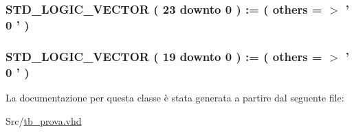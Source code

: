 \hypertarget{classtb__prova_1_1_behavioral_a64a5b798ab546bcb78f8795386e26dfa}{
\subsubsection[{x}]{ {\bfseries \textcolor{vhdlchar}{S\+T\+D\+\_\+\+L\+O\+G\+I\+C\+\_\+\+V\+E\+C\+T\+O\+R}\textcolor{vhdlchar}{ }\textcolor{vhdlchar}{(}\textcolor{vhdlchar}{ }\textcolor{vhdlchar}{ } \textcolor{vhdldigit}{23} \textcolor{vhdlchar}{ }\textcolor{vhdlchar}{downto}\textcolor{vhdlchar}{ }\textcolor{vhdlchar}{ } \textcolor{vhdldigit}{0} \textcolor{vhdlchar}{ }\textcolor{vhdlchar}{)}\textcolor{vhdlchar}{ }\textcolor{vhdlchar}{ }\textcolor{vhdlchar}{ }\textcolor{vhdlchar}{\+:}\textcolor{vhdlchar}{=}\textcolor{vhdlchar}{ }\textcolor{vhdlchar}{(}\textcolor{vhdlchar}{ }\textcolor{vhdlchar}{ }\textcolor{vhdlchar}{others}\textcolor{vhdlchar}{ }\textcolor{vhdlchar}{ }\textcolor{vhdlchar}{=}\textcolor{vhdlchar}{ }\textcolor{vhdlchar}{$>$}\textcolor{vhdlchar}{ }\textcolor{vhdlchar}{'}\textcolor{vhdlchar}{ } \textcolor{vhdldigit}{0} \textcolor{vhdlchar}{ }\textcolor{vhdlchar}{'}\textcolor{vhdlchar}{ }\textcolor{vhdlchar}{)}\textcolor{vhdlchar}{ }} \hspace{0.3cm}{\ttfamily [Signal]}}}\label{classtb__prova_1_1_behavioral_a64a5b798ab546bcb78f8795386e26dfa}
\hypertarget{classtb__prova_1_1_behavioral_a1e16feb8c16157bcc36be8c35c14072e}{
\subsubsection[{y}]{ {\bfseries \textcolor{vhdlchar}{S\+T\+D\+\_\+\+L\+O\+G\+I\+C\+\_\+\+V\+E\+C\+T\+O\+R}\textcolor{vhdlchar}{ }\textcolor{vhdlchar}{(}\textcolor{vhdlchar}{ }\textcolor{vhdlchar}{ } \textcolor{vhdldigit}{19} \textcolor{vhdlchar}{ }\textcolor{vhdlchar}{downto}\textcolor{vhdlchar}{ }\textcolor{vhdlchar}{ } \textcolor{vhdldigit}{0} \textcolor{vhdlchar}{ }\textcolor{vhdlchar}{)}\textcolor{vhdlchar}{ }\textcolor{vhdlchar}{ }\textcolor{vhdlchar}{ }\textcolor{vhdlchar}{\+:}\textcolor{vhdlchar}{=}\textcolor{vhdlchar}{ }\textcolor{vhdlchar}{(}\textcolor{vhdlchar}{ }\textcolor{vhdlchar}{ }\textcolor{vhdlchar}{others}\textcolor{vhdlchar}{ }\textcolor{vhdlchar}{ }\textcolor{vhdlchar}{=}\textcolor{vhdlchar}{ }\textcolor{vhdlchar}{$>$}\textcolor{vhdlchar}{ }\textcolor{vhdlchar}{'}\textcolor{vhdlchar}{ } \textcolor{vhdldigit}{0} \textcolor{vhdlchar}{ }\textcolor{vhdlchar}{'}\textcolor{vhdlchar}{ }\textcolor{vhdlchar}{)}\textcolor{vhdlchar}{ }} \hspace{0.3cm}{\ttfamily [Signal]}}}\label{classtb__prova_1_1_behavioral_a1e16feb8c16157bcc36be8c35c14072e}


La documentazione per questa classe è stata generata a partire dal seguente file\+:\begin{DoxyCompactItemize}
\item 
Src/\hyperlink{tb__prova_8vhd}{tb\+\_\+prova.\+vhd}\end{DoxyCompactItemize}
